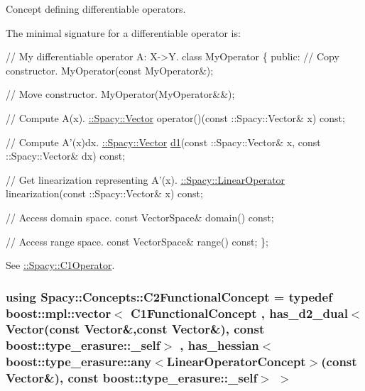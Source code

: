 Concept defining differentiable operators. 

\label{group__ConceptGroup_ga14a12c741dc237e32862fa4bc315451b_C1OperatorConceptAnchor}%
\hypertarget{group__ConceptGroup_ga14a12c741dc237e32862fa4bc315451b_C1OperatorConceptAnchor}{}%
The minimal signature for a differentiable operator is\+: 
\begin{DoxyCode}
\textcolor{comment}{// My differentiable operator A: X->Y.}
\textcolor{keyword}{class }MyOperator
\{
\textcolor{keyword}{public}:
  \textcolor{comment}{// Copy constructor.}
  MyOperator(\textcolor{keyword}{const} MyOperator&);

  \textcolor{comment}{// Move constructor.}
  MyOperator(MyOperator&&);

  \textcolor{comment}{// Compute A(x).}
  \hyperlink{classSpacy_1_1Vector}{::Spacy::Vector} operator()(const ::Spacy::Vector& x) \textcolor{keyword}{const};

  \textcolor{comment}{// Compute A'(x)dx.}
  \hyperlink{classSpacy_1_1Vector}{::Spacy::Vector} \hyperlink{group__SpacyGroup_gab6646eb7068eb9f1369e639cf0b620a2_gab6646eb7068eb9f1369e639cf0b620a2}{d1}(const ::Spacy::Vector& x, const ::Spacy::Vector& dx) \textcolor{keyword}{const};

  \textcolor{comment}{// Get linearization representing A'(x).}
 \hyperlink{group__SpacyGroup_ga584f7b9d82a844302ba0d77c3a1b6640_ga584f7b9d82a844302ba0d77c3a1b6640}{::Spacy::LinearOperator} linearization(const ::Spacy::Vector& x) \textcolor{keyword}{const};

  \textcolor{comment}{// Access domain space.}
  \textcolor{keyword}{const} VectorSpace& domain() \textcolor{keyword}{const};

  \textcolor{comment}{// Access range space.}
  \textcolor{keyword}{const} VectorSpace& range() \textcolor{keyword}{const};
\};
\end{DoxyCode}


See \hyperlink{group__SpacyGroup_ga87ae8cb0d7a567a4bb181e0a9f182620_C1OperatorAnchor}{\+:\+:Spacy\+:\+:C1\+Operator}. \hypertarget{group__ConceptGroup_gafb4414561b07b27100cad81ecf152e47_gafb4414561b07b27100cad81ecf152e47}{}
\subsubsection[{C2\+Functional\+Concept}]{\setlength{\rightskip}{0pt plus 5cm}using {\bf Spacy\+::\+Concepts\+::\+C2\+Functional\+Concept} = typedef boost\+::mpl\+::vector$<$ C1\+Functional\+Concept , has\+\_\+d2\+\_\+dual$<$Vector(const Vector\&,const Vector\&), const boost\+::type\+\_\+erasure\+::\+\_\+self$>$ , has\+\_\+hessian$<$boost\+::type\+\_\+erasure\+::any$<$Linear\+Operator\+Concept$>$(const Vector\&), const boost\+::type\+\_\+erasure\+::\+\_\+self$>$ $>$}\label{group__ConceptGroup_gafb4414561b07b27100cad81ecf152e47_gafb4414561b07b27100cad81ecf152e47}


